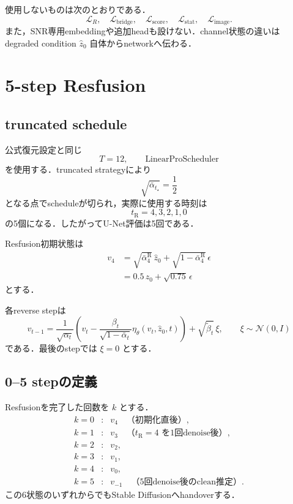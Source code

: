 \documentclass[11pt,a4paper]{ltjsarticle}
\newcommand{\N}{\mathcal{N}}
\begin{document}
使用しないものは次のとおりである．
\[
  \mathcal L_R,\quad
  \mathcal L_{\mathrm{bridge}},\quad
  \mathcal L_{\mathrm{score}},\quad
  \mathcal L_{\mathrm{stat}},\quad
  \mathcal L_{\mathrm{image}}.
\]
また，SNR専用embeddingや追加headも設けない．channel状態の違いは
degraded condition \(\hat z_0\) 自体からnetworkへ伝わる．

\section{5-step Resfusion}

\subsection{truncated schedule}

公式復元設定と同じ
\[
  T=12,\qquad \text{LinearProScheduler}
\]
を使用する．truncated strategyにより
\[
  \sqrt{\bar\alpha_{t_\star}}=\frac12
\]
となる点でscheduleが切られ，実際に使用する時刻は
\[
  t_{\mathrm R}=4,3,2,1,0
\]
の5個になる．したがってU-Net評価は5回である．

Resfusion初期状態は
\begin{equation}
\begin{aligned}
  v_4
  &=
  \sqrt{\bar\alpha^{\mathrm R}_4}\,\hat z_0
  +
  \sqrt{1-\bar\alpha^{\mathrm R}_4}\,\epsilon\\
  &=
  0.5\,\hat z_0+\sqrt{0.75}\,\epsilon
\end{aligned}
\label{eq:init}
\end{equation}
とする．

各reverse stepは
\begin{equation}
  v_{t-1}
  =
  \frac{1}{\sqrt{\alpha_t}}
  \left(
    v_t
    -
    \frac{\beta_t}{\sqrt{1-\bar\alpha_t}}
    \eta_\theta(v_t,\hat z_0,t)
  \right)
  +
  \sqrt{\tilde\beta_t}\,\xi,
  \qquad \xi\sim\N(0,I)
  \label{eq:reverse}
\end{equation}
である．最後のstepでは \(\xi=0\) とする．

\subsection{0--5 stepの定義}

Resfusionを完了した回数を \(k\) とする．
\[
\begin{array}{ccl}
  k=0 &: & v_4 \quad\text{（初期化直後）},\\
  k=1 &: & v_3 \quad\text{（\(t_{\mathrm R}=4\) を1回denoise後）},\\
  k=2 &: & v_2,\\
  k=3 &: & v_1,\\
  k=4 &: & v_0,\\
  k=5 &: & v_{-1}\quad\text{（5回denoise後のclean推定）}.
\end{array}
\]
この6状態のいずれからでもStable Diffusionへhandoverする．
\end{document}

